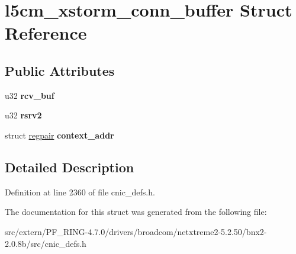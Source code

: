 \hypertarget{structl5cm__xstorm__conn__buffer}{
\section{l5cm\_\-xstorm\_\-conn\_\-buffer Struct Reference}
\label{structl5cm__xstorm__conn__buffer}
}
\subsection*{Public Attributes}
\begin{DoxyCompactItemize}
\item 
\hypertarget{structl5cm__xstorm__conn__buffer_a7819cd06d9d5716041a18d9746885088}{
u32 {\bfseries rcv\_\-buf}}
\label{structl5cm__xstorm__conn__buffer_a7819cd06d9d5716041a18d9746885088}

\item 
\hypertarget{structl5cm__xstorm__conn__buffer_a616d16d741dc2a70a6e91be57b820f38}{
u32 {\bfseries rsrv2}}
\label{structl5cm__xstorm__conn__buffer_a616d16d741dc2a70a6e91be57b820f38}

\item 
\hypertarget{structl5cm__xstorm__conn__buffer_ab6b024d1de81114df29611f6e00bf7d7}{
struct \hyperlink{structregpair}{regpair} {\bfseries context\_\-addr}}
\label{structl5cm__xstorm__conn__buffer_ab6b024d1de81114df29611f6e00bf7d7}

\end{DoxyCompactItemize}


\subsection{Detailed Description}


Definition at line 2360 of file cnic\_\-defs.h.



The documentation for this struct was generated from the following file:\begin{DoxyCompactItemize}
\item 
src/extern/PF\_\-RING-\/4.7.0/drivers/broadcom/netxtreme2-\/5.2.50/bnx2-\/2.0.8b/src/cnic\_\-defs.h\end{DoxyCompactItemize}
